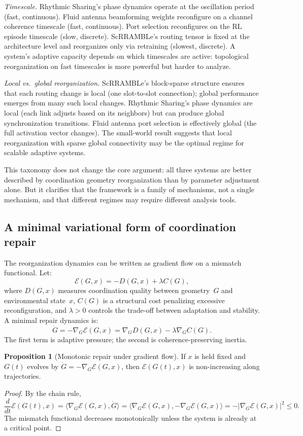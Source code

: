\documentclass[11pt, a4paper]{article}
\theoremstyle{definition}
\newtheorem{proposition}{Proposition}
\theoremstyle{remark}
\begin{document}
\textit{Timescale.} Rhythmic Sharing's phase dynamics operate at the
oscillation period (fast, continuous). Fluid antenna beamforming weights
reconfigure on a channel coherence timescale (fast, continuous). Port
selection reconfigures on the RL episode timescale (slow, discrete).
ScRRAMBLe's routing tensor is fixed at the architecture level and
reorganizes only via retraining (slowest, discrete). A system's adaptive
capacity depends on which timescales are active: topological reorganization
on fast timescales is more powerful but harder to analyze.

\textit{Local vs.\ global reorganization.} ScRRAMBLe's block-sparse
structure ensures that each routing change is local (one slot-to-slot
connection); global performance emerges from many such local changes.
Rhythmic Sharing's phase dynamics are local (each link adjusts based on
its neighbors) but can produce global synchronization transitions. Fluid
antenna port selection is effectively global (the full activation vector
changes). The small-world result suggests that local reorganization with
sparse global connectivity may be the optimal regime for scalable adaptive
systems.

This taxonomy does not change the core argument: all three systems are
better described by coordination geometry reorganization than by parameter
adjustment alone. But it clarifies that the framework is a family of
mechanisms, not a single mechanism, and that different regimes may require
different analysis tools.

\subsection*{A minimal variational form of coordination repair}

The reorganization dynamics can be written as gradient flow on a mismatch
functional. Let:
\[
\mathcal{E}(G,x) = -D(G,x) + \lambda C(G),
\]
where $D(G,x)$ measures coordination quality between geometry~$G$ and
environmental state~$x$, $C(G)$ is a structural cost penalizing excessive
reconfiguration, and $\lambda > 0$ controls the trade-off between adaptation
and stability. A minimal repair dynamics is:
\[
\dot{G} = -\nabla_G \mathcal{E}(G,x) = \nabla_G D(G,x) - \lambda \nabla_G C(G).
\]
The first term is adaptive pressure; the second is coherence-preserving
inertia.

\begin{proposition}[Monotonic repair under gradient flow]
\label{prop:monotone}
If $x$ is held fixed and $G(t)$ evolves by $\dot{G} = -\nabla_G
\mathcal{E}(G,x)$, then $\mathcal{E}(G(t),x)$ is non-increasing along
trajectories.

\begin{proof}
By the chain rule,
\[
\frac{d}{dt}\mathcal{E}(G(t),x)
= \langle \nabla_G \mathcal{E}(G,x),\dot{G} \rangle
= \langle \nabla_G \mathcal{E}(G,x), -\nabla_G \mathcal{E}(G,x) \rangle
= -|\nabla_G \mathcal{E}(G,x)|^2 \leq 0.
\]
The mismatch functional decreases monotonically unless the system is
already at a critical point.
\end{proof}
\end{proposition}
\end{document}
